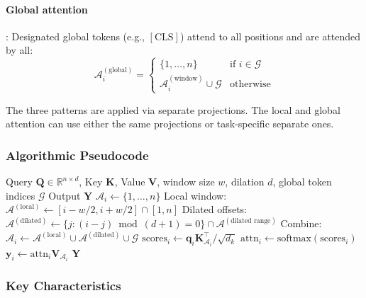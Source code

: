 \documentclass[11pt,a4paper]{article}
\begin{document}
\paragraph{Global attention}: Designated global tokens (e.g., $[\text{CLS}]$) attend to all positions and are attended by all:
\[
\mathcal{A}_i^{(\text{global})} = \begin{cases}
\{1, \ldots, n\} & \text{if } i \in \mathcal{G} \\
\mathcal{A}_i^{(\text{window})} \cup \mathcal{G} & \text{otherwise}
\end{cases}
\]

The three patterns are applied via separate projections. The local and global attention can use either the same projections or task-specific separate ones.

\subsubsection{Algorithmic Pseudocode}

\begin{algorithm}[H]
\caption{Longformer: Sliding Window + Dilated + Global}
\begin{algorithmic}[1]
\Require Query $\mathbf{Q} \in \mathbb{R}^{n \times d}$, Key $\mathbf{K}$, Value $\mathbf{V}$, window size $w$, dilation $d$, global token indices $\mathcal{G}$
\Ensure Output $\mathbf{Y}$
        \State $\mathcal{A}_i \gets \{1, \ldots, n\}$ 
    \Else
        \State Local window: $\mathcal{A}^{(\text{local})} \gets [i - w/2, i + w/2] \cap [1, n]$
        \State Dilated offsets: $\mathcal{A}^{(\text{dilated})} \gets \{j : (i-j) \bmod (d+1) = 0\} \cap \mathcal{A}^{(\text{dilated range})}$
        \State Combine: $\mathcal{A}_i \gets \mathcal{A}^{(\text{local})} \cup \mathcal{A}^{(\text{dilated})} \cup \mathcal{G}$
    \EndIf
    \State $\text{scores}_i \gets \mathbf{q}_i \mathbf{K}_{\mathcal{A}_i}^\top / \sqrt{d_k}$
    \State $\text{attn}_i \gets \text{softmax}(\text{scores}_i)$
    \State $\mathbf{y}_i \gets \text{attn}_i \mathbf{V}_{\mathcal{A}_i}$
\EndFor
\Return $\mathbf{Y}$
\end{algorithmic}
\end{algorithm}

\subsubsection{Key Characteristics}
\end{document}
